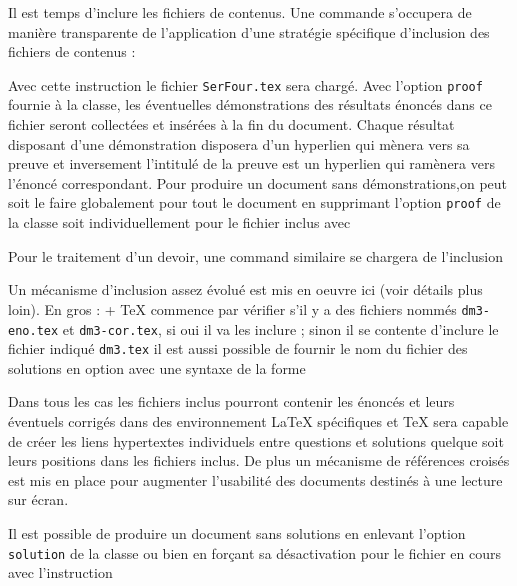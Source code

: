 \documentclass[11pt,report,oneside,solution]{cpgedev}
\begin{document}
Il est temps d'inclure les fichiers de contenus. Une commande s'occupera de manière transparente de l'application d'une stratégie spécifique d'inclusion des fichiers de contenus :
\begin{latex}[]
\end{latex}
Avec cette instruction le fichier \verb+SerFour.tex+ sera chargé. Avec l'option \verb+proof+ fournie à la classe, les éventuelles démonstrations des résultats énoncés dans ce fichier seront collectées et insérées à la fin du document.  Chaque résultat disposant d'une démonstration disposera d'un hyperlien qui mènera vers sa preuve et inversement l'intitulé de la preuve est un hyperlien qui ramènera vers l'énoncé correspondant.  Pour produire un document sans démonstrations,on peut soit le faire globalement pour tout le document en supprimant l'option \verb+proof+ de la classe soit individuellement pour le fichier inclus avec 
\begin{latex}[]
\end{latex}
Pour le traitement d'un devoir, une command similaire se chargera de l'inclusion 
\begin{latex}[]
\end{latex} 
Un mécanisme d'inclusion assez évolué est mis en oeuvre ici (voir détails plus loin). En gros :
\xit*+
\TeX{} commence par vérifier s'il y a des fichiers nommés \verb+dm3-eno.tex+ et \verb+dm3-cor.tex+, si oui il va les inclure ;
\xit sinon il se contente d'inclure le fichier indiqué \verb+dm3.tex+
\xit il est aussi possible de fournir le nom du fichier des solutions en option avec une syntaxe de la forme   
\begin{latex}[]
\end{latex}
\exit 
Dans tous les cas les fichiers inclus pourront contenir les énoncés et leurs éventuels corrigés dans des environnement \LaTeX{} spécifiques et \TeX{} sera capable de créer les liens hypertextes individuels entre questions et solutions quelque soit leurs positions dans les fichiers inclus. De plus un mécanisme de références croisés est mis en place pour augmenter l'usabilité des documents destinés à une lecture sur écran. 

Il est possible de produire un document sans solutions en enlevant l'option \verb+solution+ de la classe ou bien en forçant sa désactivation pour le fichier en cours avec l'instruction
\begin{latex}[]
\end{latex}
\end{document}
